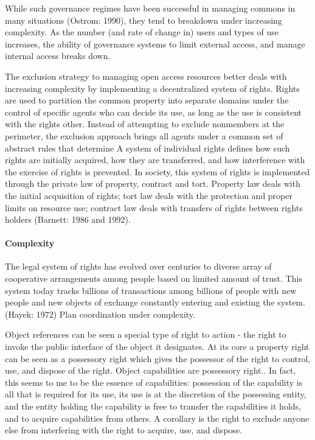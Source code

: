 \documentclass{llncs}
\begin{document}
While such governance regimes have been successful in managing commons in many situations (Ostrom: 1990), they tend to breakdown under increasing complexity. As the number (and rate of change in) users and types of use increases, the ability of governance systems to limit external access, and manage internal access breaks down. 

The exclusion strategy to managing open access resources better deals with increasing complexity by implementing a decentralized system of rights.  Rights are used to partition the common property into separate domains under the control of specific agents who can decide its use, as long as the use is consistent with the rights other. Instead of attempting to exclude nonmembers at the perimeter, the exclusion approach brings all agents under a common set of abstract rules that determine A system of individual rights defines how such rights are initially acquired, how they are transferred, and how interference with the exercise of rights is prevented. In society, this system of rights is implemented through the private law of property, contract and tort.  Property law deals with the initial acquisition of rights; tort law deals with the protection and proper limits on resource use; contract law deals with transfers of rights between rights holders (Barnett: 1986 and 1992). 


\paragraph{Complexity}

The legal system of rights has evolved over centuries to diverse array of cooperative arrangements among people based on limited amount of trust. This system today tracks billions of transactions among billions of people with new people and new objects of exchange constantly entering and existing the system. (Hayek: 1972) Plan coordination under complexity. 

Object references can be seen a special type of right to action - the right to invoke the public interface of the object it designates. At its core a property right can be seen as a possessory right which gives the possessor of the right to control, use, and dispose of the right. Object capabilities are possessory right.. In fact, this seems to me to be the essence of capabilities: possession of the capability is all that is required for its use, its use is at the discretion of the possessing entity, and the entity holding the capability is free to transfer the capabilities it holds, and to acquire capabilities from others. A corollary is the right to exclude anyone else from interfering with the right to acquire, use, and dispose.
\end{document}
